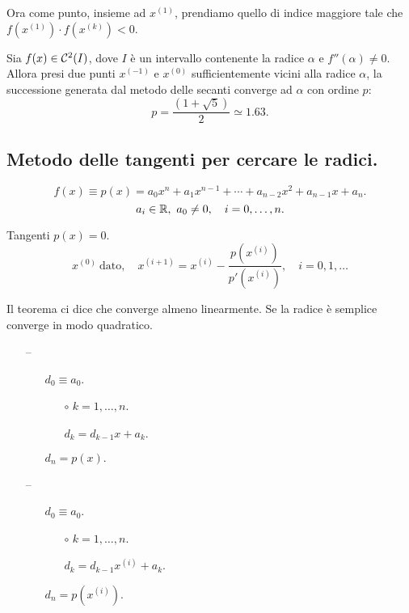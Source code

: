 Ora come punto, insieme ad $x^{(1)}$, prendiamo quello di indice maggiore tale
che $f(x^{(1)}) \cdot f(x^{(k)}) < 0$.

\begin{teo}
Sia $f(x) \in \mathcal{C}^2(I)$, dove $I$ è un intervallo contenente la radice 
$\alpha$ e $f''(\alpha) \neq 0$. Allora presi due punti $x^{(-1)}$ e $x^{(0)}$ 
sufficientemente vicini alla radice $\alpha$, la successione generata dal
 metodo delle secanti converge ad $\alpha$ con ordine $p$:
\[
p = \frac{\left(1 + \sqrt{5}\right)}{2} \simeq 1.63.
\]
\end{teo}

\subsection{Metodo delle tangenti per cercare le radici.}
\[
f(x) \equiv p(x) = a_0x^n + a_1 x^{n-1}+ \cdots + a_{n-2}x^2 +a_{n-1}x + a_n.
\]
\[a_i \in \mathbb{R},\ a_0 \neq 0, \quad i = 0, \ldots, n.\]

Tangenti $p(x) = 0$.
\[
x^{(0)} \ \textrm{dato},\quad x^{(i+1)} = x^{(i)} - \frac{p(x^{(i)})}{p'(x^{(i)})},
\quad i = 0, 1, \ldots
\]

Il teorema ci dice che converge almeno linearmente. Se la radice è semplice
converge in modo quadratico.
\begin{itemize}
\item[--]
\begin{itemize}
\item[] $d_0 \equiv a_0$.
\item[]\begin{itemize}
  \item[$\circ$]$k = 1, \ldots, n.$
  \item[]$d_k = d_{k-1}x + a_k$.
  \end{itemize}
\item[]$d_n = p(x).$
\end{itemize}       
\item[--]
\begin{itemize}
\item[] $d_0 \equiv a_0$.
\item[]\begin{itemize}
  \item[$\circ$]$k = 1, \ldots, n.$
  \item[]$d_k = d_{k-1}x^{(i)} + a_k$.
  \end{itemize}
\item[]$d_n = p(x^{(i)}).$
\end{itemize} 
\end{itemize}

